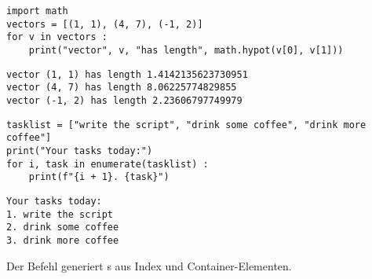 
\begin{frame}[fragile]
%
\begin{codebox}
\begin{verbatim}
import math
vectors = [(1, 1), (4, 7), (-1, 2)]
for v in vectors :
    print("vector", v, "has length", math.hypot(v[0], v[1]))
\end{verbatim}
\end{codebox}
%
\begin{cmdbox}
\begin{verbatim}
vector (1, 1) has length 1.4142135623730951
vector (4, 7) has length 8.06225774829855
vector (-1, 2) has length 2.23606797749979
\end{verbatim}
\end{cmdbox}
%
\end{frame}


\begin{frame}[fragile]
%
\begin{codebox}
\begin{verbatim}
tasklist = ["write the script", "drink some coffee", "drink more coffee"]
print("Your tasks today:")
for i, task in enumerate(tasklist) :
    print(f"{i + 1}. {task}")
\end{verbatim}
\end{codebox}
%
\begin{cmdbox}
\begin{verbatim}
Your tasks today:
1. write the script
2. drink some coffee
3. drink more coffee
\end{verbatim}
\end{cmdbox}
%
\begin{hintbox}
Der Befehl  generiert s aus Index und Container-Elementen.
\end{hintbox}
%
\end{frame}


